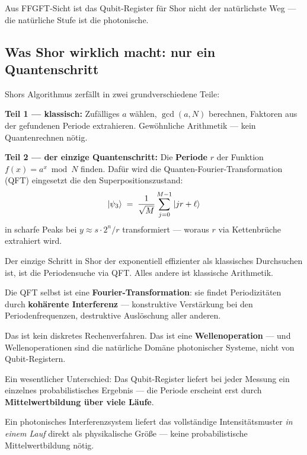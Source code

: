 Aus FFGFT-Sicht ist das Qubit-Register für Shor
nicht der natürlichste Weg ---
die natürliche Stufe ist die photonische.

\subsection{Was Shor wirklich macht: nur ein Quantenschritt}

Shors Algorithmus zerfällt in zwei grundverschiedene Teile:

\textbf{Teil 1 --- klassisch:}
Zufälliges $a$ wählen, $\gcd(a, N)$ berechnen,
Faktoren aus der gefundenen Periode extrahieren.
Gewöhnliche Arithmetik --- kein Quantenrechnen nötig.

\textbf{Teil 2 --- der einzige Quantenschritt:}
Die \textbf{Periode} $r$ der Funktion
$f(x) = a^x \bmod N$ finden.
Dafür wird die Quanten-Fourier-Transformation (QFT)
eingesetzt die den Superpositionszustand:
\begin{equation}
  \left|\psi_3\right\rangle \;=\;
  \frac{1}{\sqrt{M}}\sum_{j=0}^{M-1} \left|jr + \ell\right\rangle
\end{equation}
in scharfe Peaks bei $y \approx s \cdot 2^n / r$
transformiert --- woraus $r$ via Kettenbrüche
extrahiert wird.

\begin{keyresult}
Der einzige Schritt in Shor der exponentiell
effizienter als klassisches Durchsuchen ist,
ist die Periodensuche via QFT.
Alles andere ist klassische Arithmetik.

Die QFT selbst ist eine \textbf{Fourier-Transformation}:
sie findet Periodizitäten durch
\textbf{kohärente Interferenz} ---
konstruktive Verstärkung bei den Periodenfrequenzen,
destruktive Auslöschung aller anderen.

Das ist kein diskretes Rechenverfahren.
Das ist eine \textbf{Wellenoperation} ---
und Wellenoperationen sind die natürliche Domäne
photonischer Systeme, nicht von Qubit-Registern.

Ein wesentlicher Unterschied:
Das Qubit-Register liefert bei jeder Messung
ein einzelnes probabilistisches Ergebnis ---
die Periode erscheint erst durch
\textbf{Mittelwertbildung über viele Läufe}.

Ein photonisches Interferenzsystem liefert
das vollständige Intensitätsmuster \emph{in einem Lauf}
direkt als physikalische Größe ---
keine probabilistische Mittelwertbildung nötig.
\end{keyresult}

